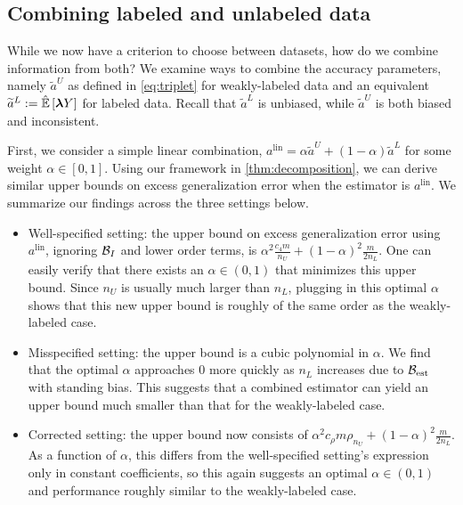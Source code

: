 


\subsection{Combining labeled and unlabeled data}
While we now have a criterion to choose between datasets, how do we combine information from both? We examine ways to combine the accuracy parameters, namely $\widetilde{a}^U$ as defined in \eqref{eq:triplet} for weakly-labeled data and an equivalent $\widetilde{a}^L := \hat{\mathbb{E}}\left[\bm{\lambda} Y\right]$ for labeled data. Recall that $\widetilde{a}^L$ is unbiased, while $\widetilde{a}^U$ is both biased and inconsistent. 

First, we consider a simple linear combination, $a^{\mathrm{lin}} = \alpha \widetilde{a}^U + (1 - \alpha) \widetilde{a}^L$ for some weight $\alpha \in [0, 1]$. Using our framework in \ref{thm:decomposition}, we can derive similar upper bounds on excess generalization error when the estimator is $a^{\mathrm{lin}}$. We summarize our findings across the three settings below. 
\begin{itemize}
    \item Well-specified setting: the upper bound on excess generalization error using $a^{\mathrm{lin}}$, ignoring $\mathcal{B}_I$ and lower order terms, is $\alpha^2 \frac{c_4 m}{n_U} + (1 - \alpha)^2 \frac{m}{2n_L}$. One can easily verify that there exists an $\alpha \in (0, 1)$ that minimizes this upper bound. Since $n_U$ is usually much larger than $n_L$, plugging in this optimal $\alpha$ shows that this new upper bound is roughly of the same order as the weakly-labeled case. 
    \item Misspecified setting: the upper bound is a cubic polynomial in $\alpha$. We find that the optimal $\alpha$ approaches $0$ more quickly as $n_L$ increases due to $\mathcal{B}_{\mathrm{est}}$ with standing bias. This suggests that a combined estimator can yield an upper bound much smaller than that for the weakly-labeled case.
    \item Corrected setting: the upper bound now consists of $\alpha^2 c_{\rho} m \rho_{n_U} + (1 - \alpha)^2 \frac{m}{2n_L}$. As a function of $\alpha$, this differs from the well-specified setting's expression only in constant coefficients, so this again suggests an optimal $\alpha \in (0, 1)$ and performance roughly similar to the weakly-labeled case.
\end{itemize}

